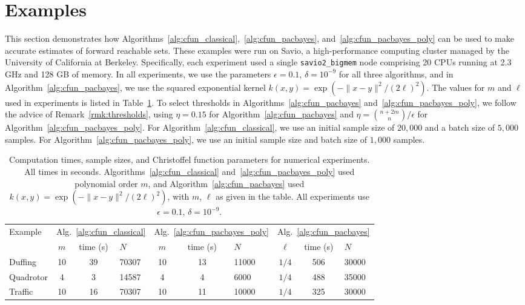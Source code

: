 \documentclass[onefignum,onetabnum]{siamart171218}
\begin{document}
\section{Examples}%
\label{sec:examples}

This section demonstrates how
Algorithms~\ref{alg:cfun_classical},~\ref{alg:cfun_pacbayes},
and~\ref{alg:cfun_pacbayes_poly}
can be used to make
accurate estimates of forward reachable sets. 
These examples were run on Savio, a high-performance computing cluster managed
by the University of California at Berkeley. Specifically, each experiment used
a single \texttt{savio2\_bigmem} node comprising 20
CPUs running at 2.3 GHz and 128 GB of memory.
In all experiments, we use the parameters $\epsilon=0.1$, $\delta=10^{-9}$ for
all three algorithms, and in Algorithm~\ref{alg:cfun_pacbayes}, we use the squared
exponential kernel $k(x,y)=\exp(-\|x-y\|^2/(2\ell)^2)$. The values for $m$
and $\ell$ used in experiments is listed in Table~\ref{tab:times}.
To select thresholds in Algorithms~\ref{alg:cfun_pacbayes}
and~\ref{alg:cfun_pacbayes_poly}, we follow the advice of
Remark~\ref{rmk:thresholds}, using $\eta=0.15$ for
Algorithm~\ref{alg:cfun_pacbayes} and $\eta=\binom{n+2m}{n}/\epsilon$ for
Algorithm~\ref{alg:cfun_pacbayes_poly}.
For Algorithm~\ref{alg:cfun_classical}, we use an initial sample size of $20,000$ and 
a batch size of $5,000$ samples. For Algorithm~\ref{alg:cfun_pacbayes_poly}, we
use an initial sample size and batch size of $1,000$ samples. 

\begin{table}[]
\centering
\begin{tabular}{@{}lcclcclccl@{}}
\toprule
\multirow{2}{*}{Example} 
& \multicolumn{3}{c}{Alg.~\ref{alg:cfun_classical}} 
& \multicolumn{3}{c}{Alg.~\ref{alg:cfun_pacbayes_poly}} 
& \multicolumn{3}{c}{Alg.~\ref{alg:cfun_pacbayes}} \\
\cmidrule(lr){2-4}
\cmidrule(lr){5-7}
\cmidrule(lr){8-10}
& $m$ & time (s) & $N$ & $m$ & time (s) & $N$ & $\ell$ & time (s) & $N$   \\ \midrule
Duffing & 10 & 39  & 70307 & 10 & 13 & 11000 & $1/4$ & 506 & 30000 \\
Quadrotor & 4 & 3  & 14587 & 4 & 4 & 6000 & $1/4$ & 488  & 35000 \\
Traffic &10 & 16 & 70307 & 10 & 11 & 10000 & $1/4$ & 325  & 30000  \\ \bottomrule
\end{tabular}
\caption{Computation times, sample sizes, and Christoffel function parameters for numerical experiments. All times in seconds.
    Algorithms~\ref{alg:cfun_classical} and~\ref{alg:cfun_pacbayes_poly} used
    polynomial order $m$, and Algorithm~\ref{alg:cfun_pacbayes} used
    $k(x,y)=\exp(-\|x-y\|^2/(2\ell)^2)$, with $m$, $\ell$ as given in the
table. All experiments use $\epsilon=0.1$, $\delta=10^{-9}$.}
\label{tab:times}
\end{table}
\end{document}
